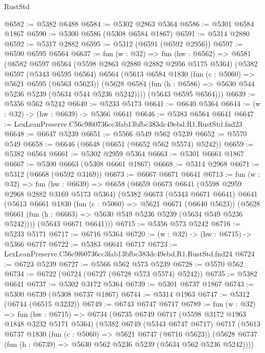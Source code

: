 \begin{lexlean}{RustStd}
\begin{coremodule}
@6582 := @5382 @6488
@6584 := @5302 @2863 @5364
@6586 := @5301 @6584 @1867
@6590 := @5300 @6586 (@5308 @6584 @1867)
@6591 := @5314 @2880
@6592 := @5317 @2882
@6595 := @5312 (@6591 (@6592 @2956))
@6597 := @6590 @6595 @6564
@6637 := fun (w : @32) =>
  fun (hw : @6562) =>
  @6581
    (@6582
      @6597
      @6564
      (@5598 @2863 @2880 @2882 @2956 @5175 @5364)
      (@5382
        @6597
        (@5343 @6595 @6564)
        @6564
        (@5613
          @6584
          @1830
          (fun (c : @5060) => @5621 @6595 (@6563 @5623))
          (@5628 @6584 (fun (h : @6586) => @5630 @544 @5236 @5239 (@5634 @544 @5236 @5242))))
        (@5643 @6595 @6564)))
@6639 := @5356 @562 @5242
@6640 := @5233 @5173
@6641 := @6640 @5364
@6644 := (w : @32) -> (hw : @6639) -> @5366 @6641
@6646 := @5383 @6564 @6641
@6647 := LexLeanPreserve.C56c9f60736cc3fab13bfbc383dc49ebd.R1.RustStd.fnd23
@6648 := @6647 @5239
@6651 := @5566 @549 @562 @5239
@6652 := @5570 @549
@6658 := @6646 (@6648 (@6651 (@6652 @562 @5574) @5242))
@6659 := @5382 @6564
@6661 := @5302 @2959 @5364
@6663 := @5301 @6661 @1867
@6667 := @5300 @6663 (@5308 @6661 @1867)
@6668 := @5314 @2968
@6671 := @5312 (@6668 (@6592 @3169))
@6673 := @6667 @6671 @6641
@6713 := fun (w : @32) =>
  fun (hw : @6639) =>
  @6658
    (@6659
      @6673
      @6641
      (@5598 @2959 @2968 @2882 @3169 @5173 @5364)
      (@5382
        @6673
        (@5343 @6671 @6641)
        @6641
        (@5613
          @6661
          @1830
          (fun (c : @5060) => @5621 @6671 (@6640 @5623))
          (@5628 @6661 (fun (h : @6663) => @5630 @549 @5236 @5239 (@5634 @549 @5236 @5242))))
        (@5643 @6671 @6641)))
@6715 := @5356 @573 @5242
@6716 := @5233 @5171
@6717 := @6716 @5364
@6720 := (w : @32) -> (hw : @6715) -> @5366 @6717
@6722 := @5383 @6641 @6717
@6723 := LexLeanPreserve.C56c9f60736cc3fab13bfbc383dc49ebd.R1.RustStd.fnd24
@6724 := @6723 @5239
@6727 := @5566 @562 @573 @5239
@6728 := @5570 @562
@6734 := @6722 (@6724 (@6727 (@6728 @573 @5574) @5242))
@6735 := @5382 @6641
@6737 := @5302 @3172 @5364
@6739 := @5301 @6737 @1867
@6743 := @5300 @6739 (@5308 @6737 @1867)
@6744 := @5314 @1963
@6747 := @5312 (@6744 (@6515 @3232))
@6749 := @6743 @6747 @6717
@6789 := fun (w : @32) =>
  fun (hw : @6715) =>
  @6734
    (@6735
      @6749
      @6717
      (@5598 @3172 @1963 @1848 @3232 @5171 @5364)
      (@5382
        @6749
        (@5343 @6747 @6717)
        @6717
        (@5613
          @6737
          @1830
          (fun (c : @5060) => @5621 @6747 (@6716 @5623))
          (@5628 @6737 (fun (h : @6739) => @5630 @562 @5236 @5239 (@5634 @562 @5236 @5242))))

\end{coremodule}
\end{lexlean}
